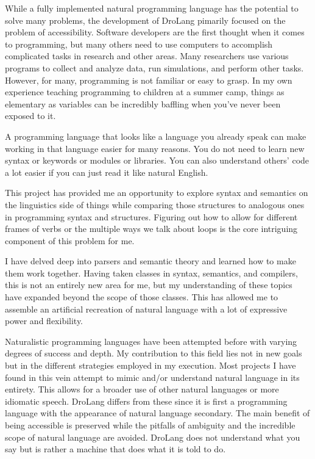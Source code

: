 \documentclass[titlepage]{article}
\newcommand{\langName}{DroLang}
\begin{document}
While a fully implemented natural programming language has the potential to solve many problems, the development of \langName{} pimarily focused on the problem of accessibility. Software developers are the first thought when it comes to programming, but many others need to use computers to accomplish complicated tasks in research and other areas. Many researchers use various programs to collect and analyze data, run simulations, and perform other tasks. However, for many, programming is not familiar or easy to grasp. In my own experience teaching programming to children at a summer camp, things as elementary as variables can be incredibly baffling when you've never been exposed to it.

A programming language that looks like a language you already speak can make working in that language easier for many reasons. You do not need to learn new syntax or keywords or modules or libraries. You can also understand others' code a lot easier if you can just read it like natural English.

This project has provided me an opportunity to explore syntax and semantics on the linguistics side of things while comparing those structures to analogous ones in programming syntax and structures. Figuring out how to allow for different frames of verbs or the multiple ways we talk about loops is the core intriguing component of this problem for me.

I have delved deep into parsers and semantic theory and learned how to make them work together. Having taken classes in syntax, semantics, and compilers, this is not an entirely new area for me, but my understanding of these topics have expanded beyond the scope of those classes. This has allowed me to assemble an artificial recreation of natural language with a lot of expressive power and flexibility.

Naturalistic programming languages have been attempted before with varying degrees of success and depth. My contribution to this field lies not in new goals but in the different strategies employed in my execution. Most projects I have found in this vein attempt to mimic and/or understand natural language in its entirety. This allows for a broader use of other natural languages or more idiomatic speech. \langName{} differs from these since it is first a programming language with the appearance of natural language secondary. The main benefit of being accessible is preserved while the pitfalls of ambiguity and the incredible scope of natural language are avoided. \langName{} does not understand what you say but is rather a machine that does what it is told to do.
\end{document}
